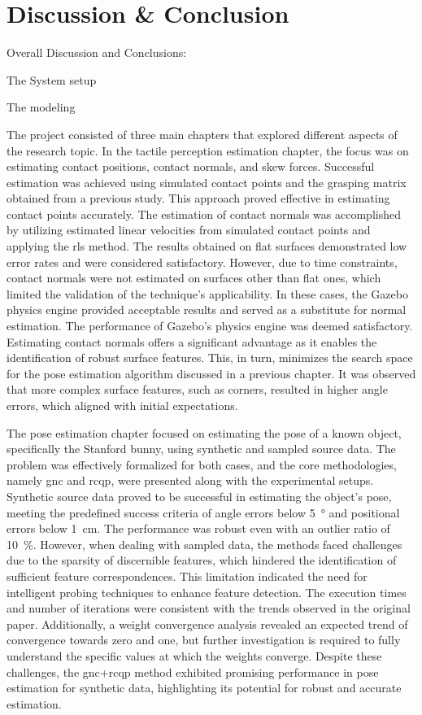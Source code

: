 \chapter{Discussion \& Conclusion}\label{ch:discussion-conlcusion}


Overall Discussion and Conclusions:

The System setup 

The modeling


The project consisted of three main chapters that explored different aspects of the research topic. In the tactile perception estimation chapter, the focus was on estimating contact positions, contact normals, and skew forces. Successful estimation was achieved using simulated contact points and the grasping matrix obtained from a previous study. This approach proved effective in estimating contact points accurately. The estimation of contact normals was accomplished by utilizing estimated linear velocities from simulated contact points and applying the \gls{rls} method. The results obtained on flat surfaces demonstrated low error rates and were considered satisfactory. However, due to time constraints, contact normals were not estimated on surfaces other than flat ones, which limited the validation of the technique's applicability. In these cases, the Gazebo physics engine provided acceptable results and served as a substitute for normal estimation. The performance of Gazebo's physics engine was deemed satisfactory. Estimating contact normals offers a significant advantage as it enables the identification of robust surface features. This, in turn, minimizes the search space for the pose estimation algorithm discussed in a previous chapter. It was observed that more complex surface features, such as corners, resulted in higher angle errors, which aligned with initial expectations.

The pose estimation chapter focused on estimating the pose of a known object, specifically the Stanford bunny, using synthetic and sampled source data. The problem was effectively formalized for both cases, and the core methodologies, namely \gls{gnc} and \gls{rcqp}, were presented along with the experimental setups. Synthetic source data proved to be successful in estimating the object's pose, meeting the predefined success criteria of angle errors below \SI{5}{\degree} and positional errors below \SI{1}{cm}. The performance was robust even with an outlier ratio of \SI{10}{\percent}. However, when dealing with sampled data, the methods faced challenges due to the sparsity of discernible features, which hindered the identification of sufficient feature correspondences. This limitation indicated the need for intelligent probing techniques to enhance feature detection. The execution times and number of iterations were consistent with the trends observed in the original paper. Additionally, a weight convergence analysis revealed an expected trend of convergence towards zero and one, but further investigation is required to fully understand the specific values at which the weights converge. Despite these challenges, the \gls{gnc}+\gls{rcqp} method exhibited promising performance in pose estimation for synthetic data, highlighting its potential for robust and accurate estimation.


